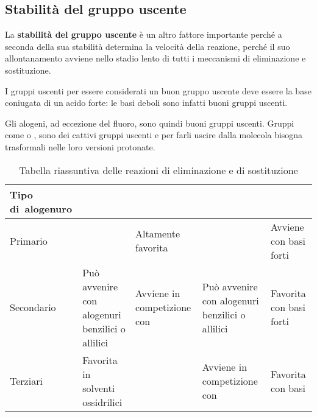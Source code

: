 
\subsection*{Stabilità del gruppo uscente}
La \textbf{stabilità del gruppo uscente} è un altro fattore importante perché a seconda della sua stabilità determina la velocità della reazione, perché il suo allontanamento avviene nello stadio lento di tutti i meccanismi di eliminazione e sostituzione.

I gruppi uscenti per essere considerati un buon gruppo uscente deve essere la base coniugata di un acido forte: le basi deboli sono infatti buoni gruppi uscenti.

Gli alogeni, ad eccezione del fluoro, sono quindi buoni gruppi uscenti. Gruppi come  o , sono dei cattivi gruppi uscenti e per farli uscire dalla molecola bisogna trasformali nelle loro versioni protonate.

\begin{table}[H]
	\centering
	\renewcommand{\arraystretch}{2}
	\begin{tabularx}{\textwidth}{X X X X X}
		\toprule
		Tipo \mbox{di alogenuro} & \multicolumn{1}{c}{\mech[1]}                    & \multicolumn{1}{c}{\mech[2]}         & \multicolumn{1}{c}{\mech[e1]}                   & \multicolumn{1}{c}{\mech[e2]} \\
		\midrule
		Primario                 &                                                 & Altamente \mbox{favorita}             &                                                 & Avviene con basi forti        \\
		Secondario               & Può avvenire con alogenuri benzilici o allilici & Avviene in competizione con \mech[e2] & Può avvenire con alogenuri benzilici o allilici & Favorita con basi forti       \\
		Terziari                 & Favorita in solventi ossidrilici                &                                       & Avviene in competizione con \mech[1]            & Favorita con basi             \\
		\bottomrule
	\end{tabularx}
	\caption{Tabella riassuntiva delle reazioni di eliminazione e di sostituzione}
\end{table}